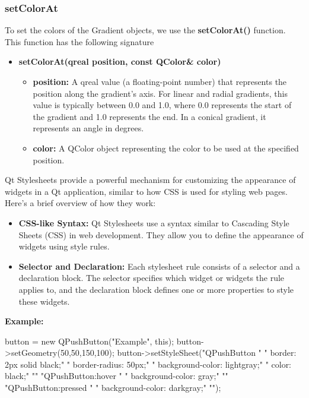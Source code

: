 \documentclass{report}
\begin{document}
    \bigbreak \noindent 
    \subsubsection{setColorAt}
    \bigbreak \noindent 
    To set the colors of the Gradient objects, we use the \textbf{setColorAt()} function. This function has the following signature
    \begin{itemize}
        \item \textbf{setColorAt(qreal position, const QColor\& color)}
            \begin{itemize}
                \item \textbf{position:} A qreal value (a floating-point number) that represents the position along the gradient's axis. For linear and radial gradients, this value is typically between 0.0 and 1.0, where 0.0 represents the start of the gradient and 1.0 represents the end. In a conical gradient, it represents an angle in degrees.
                \item \textbf{color:} A QColor object representing the color to be used at the specified position.
            \end{itemize}
    \end{itemize}


    \pagebreak
    \bigbreak \noindent 
    \begin{concept}
        Qt Stylesheets provide a powerful mechanism for customizing the appearance of widgets in a Qt application, similar to how CSS is used for styling web pages. Here's a brief overview of how they work: 
        \begin{itemize}
            \item \textbf{CSS-like Syntax:} Qt Stylesheets use a syntax similar to Cascading Style Sheets (CSS) in web development. They allow you to define the appearance of widgets using style rules.
            \item \textbf{Selector and Declaration:} Each stylesheet rule consists of a selector and a declaration block. The selector specifies which widget or widgets the rule applies to, and the declaration block defines one or more properties to style these widgets.
        \end{itemize}
    \end{concept}
    \bigbreak \noindent 
    \textbf{Example:}
    \bigbreak \noindent 
    \begin{cppcode}
        button = new QPushButton("Example", this);
        button->setGeometry(50,50,150,100);
        button->setStyleSheet("QPushButton {"
                      "  border: 2px solid black;"  
                      "  border-radius: 50px;"
                      "  background-color: lightgray;"  
                      "  color: black;"  
                      "}"
                      "QPushButton:hover {"
                      "  background-color: gray;"  
                      "}"
                      "QPushButton:pressed {"
                      "  background-color: darkgray;"  
                      "}");
    \end{cppcode}
\end{document}
